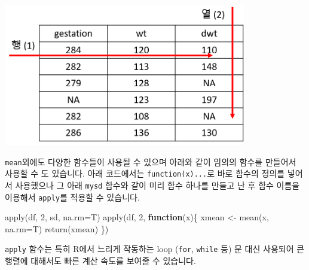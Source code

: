 \documentclass[
]{book}
\newenvironment{Shaded}{\begin{snugshade}}{\end{snugshade}}
\newcommand{\AttributeTok}[1]{\textcolor[rgb]{0.77,0.63,0.00}{#1}}
\newcommand{\ControlFlowTok}[1]{\textcolor[rgb]{0.13,0.29,0.53}{\textbf{#1}}}
\newcommand{\DecValTok}[1]{\textcolor[rgb]{0.00,0.00,0.81}{#1}}
\newcommand{\FunctionTok}[1]{\textcolor[rgb]{0.00,0.00,0.00}{#1}}
\newcommand{\NormalTok}[1]{#1}
\newcommand{\OtherTok}[1]{\textcolor[rgb]{0.56,0.35,0.01}{#1}}
\begin{document}
\includegraphics[width=4.16667in,height=\textheight]{images/07/01.png}

\texttt{mean}외에도 다양한 함수들이 사용될 수 있으며 아래와 같이 임의의 함수를 만들어서 사용할 수 도 있습니다. 아래 코드에서는 \texttt{function(x)...}로 바로 함수의 정의를 넣어서 사용했으나 그 아래 \texttt{mysd} 함수와 같이 미리 함수 하나를 만들고 난 후 함수 이름을 이용해서 \texttt{apply}를 적용할 수 있습니다.

\begin{Shaded}
\begin{Highlighting}[]

\FunctionTok{apply}\NormalTok{(df, }\DecValTok{2}\NormalTok{, sd, }\AttributeTok{na.rm=}\NormalTok{T)}
\FunctionTok{apply}\NormalTok{(df, }\DecValTok{2}\NormalTok{, }\ControlFlowTok{function}\NormalTok{(x)\{ }
\NormalTok{  xmean }\OtherTok{\textless{}{-}} \FunctionTok{mean}\NormalTok{(x, }\AttributeTok{na.rm=}\NormalTok{T) }
  \FunctionTok{return}\NormalTok{(xmean)}
\NormalTok{  \})}
\end{Highlighting}
\end{Shaded}

\texttt{apply} 함수는 특히 R에서 느리게 작동하는 loop (\texttt{for}, \texttt{while} 등) 문 대신 사용되어 큰 행렬에 대해서도 빠른 계산 속도를 보여줄 수 있습니다.
\end{document}
